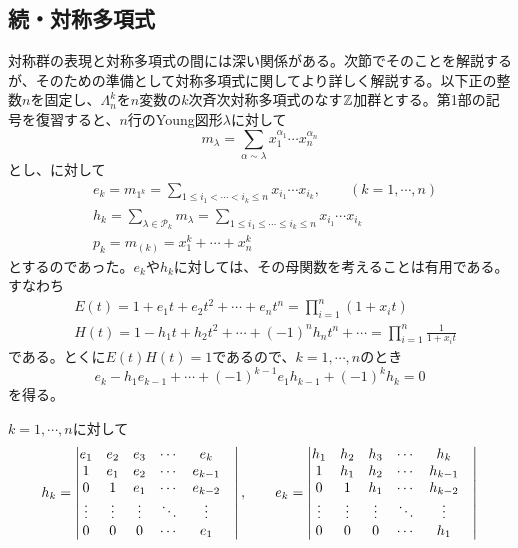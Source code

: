 \documentclass{ltjsreport}
\begin{document}
\subsection{続・対称多項式}
対称群の表現と対称多項式の間には深い関係がある。次節でそのことを解説するが、そのための準備として対称多項式に関してより詳しく解説する。以下正の整数$n$を固定し、$\Lambda^k_n$を$n$変数の$k$次斉次対称多項式のなす$\mathbb{Z}$加群とする。第1部の記号を復習すると、$n$行のYoung図形$\lambda$に対して
\[
m_\lambda=\sum_{\alpha\sim\lambda}x_1^{\alpha_1}\cdots x_n^{\alpha_n}  
\]
とし、に対して
\begin{align*}
  &e_k=m_{1^k}=\sum_{1\leq i_1<\cdots<i_k\leq n}x_{i_1}\cdots x_{i_k},\qquad(k=1,\cdots,n)\\
  &h_k=\sum_{\lambda\in\mathcal{P}_k}m_\lambda=\sum_{1\leq i_1\leq\cdots\leq i_k\leq n}x_{i_1}\cdots x_{i_k}\\
  &p_k=m_{(k)}=x_1^k+\cdots+x_n^k
\end{align*}
とするのであった。$e_k$や$h_k$に対しては、その母関数を考えることは有用である。すなわち
\begin{align}
  &E(t)=1+e_1t+e_2t^2+\cdots+e_nt^n=\prod_{i=1}^n(1+x_it) \label{gen_func_of_e}\\
  &H(t)=1-h_1t+h_2t^2+\cdots+(-1)^nh_nt^n+\cdots=\prod_{i=1}^n\frac{1}{1+x_it}
\end{align}
である。とくに$E(t)H(t)=1$であるので、$k=1,\cdots,n$のとき
\begin{equation}\label{e_to_h}
  e_k-h_1e_{k-1}+\cdots+(-1)^{k-1}e_1h_{k-1}+(-1)^kh_k=0   
\end{equation}
を得る。

\begin{prop}\label{det_formula}
  $k=1,\cdots,n$に対して
  \begin{align*}
    h_k=\begin{vmatrix} 
      e_1&e_2&e_3&\cdots&e_k\\
      1&e_1&e_2&\cdots&e_{k-1}\\
      0&1&e_1&\cdots&e_{k-2}\\
      \vdots&\vdots&\vdots&\ddots&\vdots&\\
      0&0&0&\cdots&e_1 \end{vmatrix},\qquad
    e_k=\begin{vmatrix} 
      h_1&h_2&h_3&\cdots&h_k\\
      1&h_1&h_2&\cdots&h_{k-1}\\
      0&1&h_1&\cdots&h_{k-2}\\
      \vdots&\vdots&\vdots&\ddots&\vdots&\\
      0&0&0&\cdots&h_1
     \end{vmatrix}
  \end{align*}
\end{prop}
\end{document}
